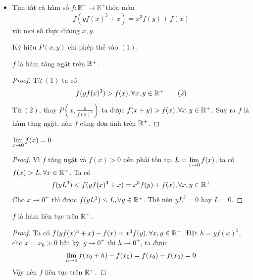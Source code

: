\documentclass[11pt]{scrartcl}
\begin{document}
\begin{itemize}[label=, leftmargin=0em, itemsep=0.5em]
\begin{sol}
\begin{proof}
                Giả sử $\frac{g(x)}{g(y)}>\frac{h(x)}{h(y)}$, khi đó ta có thể chọn $p, q \in \mathbb{Z}^{+}$sao cho
                $ 
                \frac{g(x)}{g(y)}>\frac{q}{p}>\frac{h(x)}{h(y)}
                $
                điều này mâu thuẫn với chứng minh trên. Vậy
                $$
                \frac{h(x)}{h(y)} \geq \frac{g(x)}{g(y)} \Longrightarrow \frac{h(x)}{g(x)} \geq \frac{h(y)}{g(y)} \quad \forall x, y>0 .
                $$

                Thay đổi vai trò $x, y$ trong đánh giá trên ta thu được $\frac{h(x)}{g(x)}=\frac{h(y)}{g(y)}=c \quad \forall x, y>0$.
        \end{proof}
        Trở lại bài toán. Giả sử tồn tại hàm số thỏa mãn.
        Áp dụng bổ đề trên ta suy ra tồn tại số thực dương $c$ sao cho
        $$
        \frac{f(x)}{x}=c \Longrightarrow f(x)=c x \quad \forall x>0
        $$
        Từ đây tìm được $c = 1$. Vậy hàm duy nhất thỏa mãn là $\boxed{f(x) = x, \xro}$.
    \end{sol}

    \item \begin{bt}
        Tìm tất cả hàm số $f: \mathbb{R}^{+} \rightarrow \mathbb{R}^{+}$thỏa mãn
        \[
        f\left(y f(x)^3+x\right)=x^3 f(y)+f(x)\tag{1}
        \]
        với mọi số thực dương $x, y$.
    \end{bt}
    \begin{sol}
        Ký hiệu $P(x,y)$ chỉ phép thế vào $(1)$.
        
         $f$ là hàm tăng ngặt trên $\mathbb{R^+}$. 
        \begin{proof}
            Từ $(1)$ ta có 
        \[
            f(yf(x)^3) > f(x), \forall x,y \in \mathbb{R^+} \tag{2}
        \]
        Từ $(2)$, thay $P\left(x,\frac{y}{f(x)^3}\right)$ ta được $f(x + y) > f(x), \forall x,y \in \mathbb{R^+}$. Suy ra $f$ là hàm tăng ngặt, nên $f$ cũng đơn ánh trên $\mathbb{R^+}$.
        \end{proof}

         $\displaystyle\lim_{x \to 0}f(x) = 0$. 
        \begin{proof}
            Vì $f$ tăng ngặt và $f(x) > 0$ nên phải tồn tại $L = \displaystyle\lim_{x \to 0}f(x)$, ta có $f(x) > L, \forall x\in \mathbb{R^+}$. Ta có 
            \[
            f(yL^3) < f(yf(x)^3 + x) = x^3f(y) + f(x), \forall x,y \in \mathbb{R^+}
            \]
            Cho $x \to 0^+$ thì được $f(yL^3) \leq L, \forall y\in \mathbb{R^+}$. Thế nên $yL^3 = 0$ hay $L = 0$.
            
        \end{proof}
         $f$ là hàm liên tục trên $\mathbb{R^+}$. 
        \begin{proof}
            Ta có $f(yf(x)^3 + x) - f(x) = x^3f(y), \forall x,y \in \mathbb{R^+}$. Đặt $h = yf(x)^3$, cho $x =x_0 > 0$ bất kỳ, $y \to 0^+$ thì $h \to 0^+$, ta được 
            \[
                \displaystyle\lim_{h \to 0} f(x_0 + h) - f(x_0) =  f(x_0) - f(x_0) = 0
            \]
            Vậy nên $f$ liên tục trên $\mathbb{R}^+$.
        \end{proof}
        

\end{sol}
\end{itemize}
\end{document}
